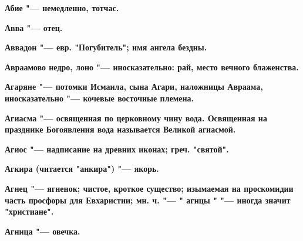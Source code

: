 

 



































\bfseries Абие \normalfont{} "--- немедленно, тотчас. 




\bfseries Авва \normalfont{} "--- отец. 




\bfseries Аввадон \normalfont{} "--- евр. "Погубитель"; имя ангела бездны. 




\bfseries Авраамово недро, лоно \normalfont{} "--- иносказательно: рай, место вечного блаженства. 




\bfseries Агаряне \normalfont{} "--- потомки Исмаила, сына Агари, наложницы Авраама, иносказательно "--- кочевые восточные племена. 




\bfseries Агиасма \normalfont{} "--- освященная по церковному чину вода. Освященная на празднике Богоявления вода называется Великой агиасмой. 




\bfseries Агиос \normalfont{} "--- надписание на древних иконах; греч. "святой". 




\bfseries Агкира \normalfont{} (читается "анкира") "--- якорь. 




\bfseries Агнец \normalfont{} "--- ягненок; чистое, кроткое существо; изымаемая на проскомидии часть просфоры для Евхаристии; мн. ч. "--- " \bfseries агнцы \normalfont{}" "--- иногда значит "христиане". 




\bfseries Агница \normalfont{} "--- овечка. 





